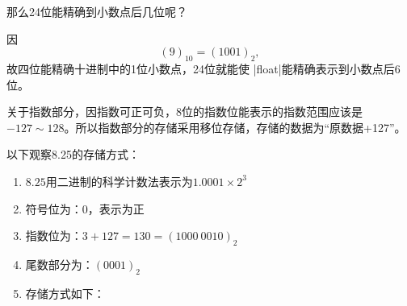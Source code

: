 %
\begin{frame}
 
\begin{question}[]{}
那么24位能精确到小数点后几位呢？ 
\end{question}
因$$
(9)_{10}=(1001)_2,
$$
故四位能精确十进制中的1位小数点，24位就能使 \lst|float|能精确表示到小数点后6位。
\end{frame}
\begin{frame}
关于指数部分，因指数可正可负，8位的指数位能表示的指数范围应该是$-127\sim 128$。所以指数部分的存储采用移位存储，存储的数据为“原数据+127”。
\end{frame}
\begin{frame}
以下观察8.25的存储方式： 

\begin{enumerate}
\item $8.25$用二进制的科学计数法表示为$1.0001\times2^3$\\[0.1in] \pause 
\item 符号位为：0，表示为正
\item[] 指数位为：$3+127=130=(1000~0010)_2$
\item[] 尾数部分为：$(0001)_2$\\[0.1in]\pause 
\item 存储方式如下：
\begin{figure}
\centering
{}
\end{figure}
\end{enumerate}
\end{frame}

